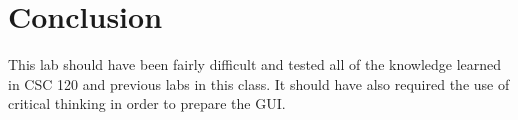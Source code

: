 \section{Conclusion}

This lab should have been fairly difficult and tested all of the knowledge learned in CSC 120 and previous labs in this class.
It should have also required the use of critical thinking in order to prepare the GUI.